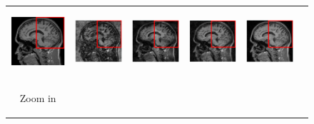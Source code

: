 \documentclass[review]{elsarticle}
\begin{document}
\begin{figure}[H]
\begin{raggedleft}
\begin{tabular}{cccccc}
			\includegraphics[width=2.5cm,height=2.5cm]{include/grp2/factor6/022-Guys-0701-T1/022-Guys-0701-T1_images__50} &
			\includegraphics[width=2.5cm,height=2.5cm]{include/grp2/factor6/022-Guys-0701-T1/022-Guys-0701-T1_images__zeroPadding_50} & \includegraphics[width=2.5cm,height=2.5cm]{include/grp2/factor6/022-Guys-0701-T1/022-Guys-0701-T1_images__CS_50} & \includegraphics[width=2.5cm,height=2.5cm]{include/grp2/factor6/022-Guys-0701-T1/022-Guys-0701-T1_images__IMCNNL2TUNE_50} & \includegraphics[width=2.5cm,height=2.5cm]{include/grp2/factor6/022-Guys-0701-T1/022-Guys-0701-T1_images__predict_50}
			
			\tabularnewline
			
			\multirow{1}{0.05cm}[1.3cm]{\begin{turn}{90} {\footnotesize Zoom in} \end{turn}} &
			

\end{tabular}
\end{raggedleft}
\end{figure}
\end{document}
